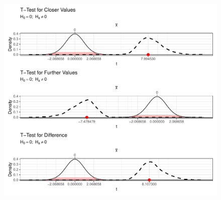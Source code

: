\documentclass{article}\usepackage[]{graphicx}\usepackage[]{xcolor}
\begin{document}
\begin{enumerate}
\begin{enumerate}
\begin{figure}[H]
\begin{center}
\includegraphics[scale=0.5]{Rplot.pdf}
\label{plot2}
\end{center}
\end{figure}
\end{enumerate}
\end{enumerate}



\end{document}
